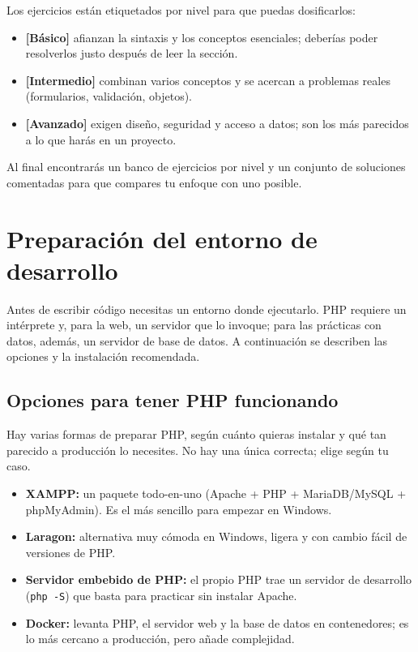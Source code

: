 \documentclass[11pt]{article}
\begin{document}
Los ejercicios están etiquetados por nivel para que puedas dosificarlos:

\begin{itemize}[leftmargin=1.4em,itemsep=2pt,topsep=2pt]
\item \textbf{[Básico]} afianzan la sintaxis y los conceptos esenciales; deberías poder resolverlos justo después de leer la sección.
\item \textbf{[Intermedio]} combinan varios conceptos y se acercan a problemas reales (formularios, validación, objetos).
\item \textbf{[Avanzado]} exigen diseño, seguridad y acceso a datos; son los más parecidos a lo que harás en un proyecto.
\end{itemize}
Al final encontrarás un banco de ejercicios por nivel y un conjunto de soluciones comentadas para que compares tu enfoque con uno posible.

\section{Preparación del entorno de desarrollo}
Antes de escribir código necesitas un entorno donde ejecutarlo. PHP requiere un intérprete y, para la web, un servidor que lo invoque; para las prácticas con datos, además, un servidor de base de datos. A continuación se describen las opciones y la instalación recomendada.

\subsection{Opciones para tener PHP funcionando}
Hay varias formas de preparar PHP, según cuánto quieras instalar y qué tan parecido a producción lo necesites. No hay una única correcta; elige según tu caso.

\begin{itemize}[leftmargin=1.4em,itemsep=2pt,topsep=2pt]
\item \textbf{XAMPP:} un paquete todo-en-uno (Apache + PHP + MariaDB/MySQL + phpMyAdmin). Es el más sencillo para empezar en Windows.
\item \textbf{Laragon:} alternativa muy cómoda en Windows, ligera y con cambio fácil de versiones de PHP.
\item \textbf{Servidor embebido de PHP:} el propio PHP trae un servidor de desarrollo (\texttt{php -S}) que basta para practicar sin instalar Apache.
\item \textbf{Docker:} levanta PHP, el servidor web y la base de datos en contenedores; es lo más cercano a producción, pero añade complejidad.
\end{itemize}
\end{document}
